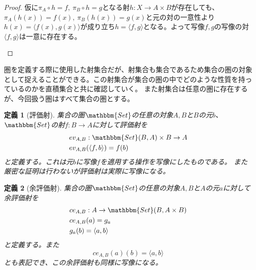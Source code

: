 \documentclass[dvipdfmx]{jsarticle}
\newcommand{\cat}[1]{\mathbbm{#1}}
\newcommand{\arrow}{\rightarrow}
\newcommand{\tuple}[1]{\langle #1\rangle}
\newcommand{\mor}[3]{#1:#2\arrow #3}
\newcommand{\arset}[3]{\cat{#1}(#2,#3)}
\newtheorem{proof}{証明}[section]
\newtheorem{define}{定義}[section]
\numberwithin{proof}{subsection}
\numberwithin{prop}{subsection}
\numberwithin{define}{subsection}
\begin{document}
\begin{proof}
		仮に$\pi_A\circ h=f,\ \pi_B\circ h=g$となる射$\mor{h}{X}{A\times B}$が存在しても、
		$\pi_A(h(x))=f(x),\ \pi_B(h(x))=g(x)$と元の対の一意性より$h(x)=\tuple{f(x),g(x)}$が成り立ち$h=\tuple{f,g}$となる。よって写像$f,g$の写像の対$\tuple{f,g}$は一意に存在する。
		\begin{center}
		\end{center}
	\end{proof}

	圏を定義する際に使用した射集合だが、射集合も集合であるため集合の圏の対象として捉えることができる。この射集合が集合の圏の中でどのような性質を持っているのかを直積集合と共に確認していく。
	また射集合は任意の圏に存在するが、今回扱う圏はすべて集合の圏とする。

	\begin{define}[評価射]
		集合の圏$\cat{Set}$の任意の対象$A,B$と$B$の元$b$、$\cat{Set}$の射$\mor{f}{B}{A}$に対して評価射を
		\begin{align*}
			\mor{&ev_{A,B}}{\arset{Set}{B}{A}\times B}{A}\\
			&ev_{A,B}(\tuple{f,b})=f(b)\\
		\end{align*}
		と定義する。これは元$b$に写像$f$を適用する操作を写像にしたものである。
		また厳密な証明は行わないが評価射は実際に写像になる。
	\end{define}
	\begin{define}[余評価射]
		集合の圏$\cat{Set}$の任意の対象$A,B$と$A$の元$a$に対して余評価射を
		\begin{align*}
			\mor{&ce_{A,B}}{A}{\arset{Set}{B}{A\times B}}\\
			&ce_{A,B}(a)=g_a\\
			&g_a(b)=\tuple{a,b}
		\end{align*}
		と定義する。また\[ce_{A,B}(a)(b)=\tuple{a,b}\]とも表記でき、この余評価射も同様に写像になる。
	\end{define}
\end{document}
